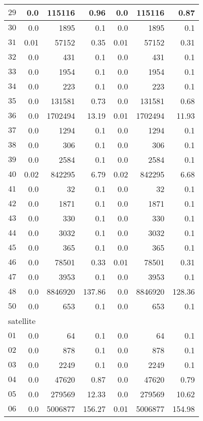 \begin{longtable}{|c||r|r|r||r|r|r|}
$29$ & 0.0 & 115116 & 0.96 &0.0 & 115116 & 0.87 \\\hline
$30$ & 0.0 & 1895 & 0.1 &0.0 & 1895 & 0.1 \\\hline
$31$ & 0.01 & 57152 & 0.35 &0.01 & 57152 & 0.31 \\\hline
$32$ & 0.0 & 431 & 0.1 &0.0 & 431 & 0.1 \\\hline
$33$ & 0.0 & 1954 & 0.1 &0.0 & 1954 & 0.1 \\\hline
$34$ & 0.0 & 223 & 0.1 &0.0 & 223 & 0.1 \\\hline
$35$ & 0.0 & 131581 & 0.73 &0.0 & 131581 & 0.68 \\\hline
$36$ & 0.0 & 1702494 & 13.19 &0.01 & 1702494 & 11.93 \\\hline
$37$ & 0.0 & 1294 & 0.1 &0.0 & 1294 & 0.1 \\\hline
$38$ & 0.0 & 306 & 0.1 &0.0 & 306 & 0.1 \\\hline
$39$ & 0.0 & 2584 & 0.1 &0.0 & 2584 & 0.1 \\\hline
$40$ & 0.02 & 842295 & 6.79 &0.02 & 842295 & 6.68 \\\hline
$41$ & 0.0 & 32 & 0.1 &0.0 & 32 & 0.1 \\\hline
$42$ & 0.0 & 1871 & 0.1 &0.0 & 1871 & 0.1 \\\hline
$43$ & 0.0 & 330 & 0.1 &0.0 & 330 & 0.1 \\\hline
$44$ & 0.0 & 3032 & 0.1 &0.0 & 3032 & 0.1 \\\hline
$45$ & 0.0 & 365 & 0.1 &0.0 & 365 & 0.1 \\\hline
$46$ & 0.0 & 78501 & 0.33 &0.01 & 78501 & 0.31 \\\hline
$47$ & 0.0 & 3953 & 0.1 &0.0 & 3953 & 0.1 \\\hline
$48$ & 0.0 & 8846920 & 137.86 &0.0 & 8846920 & 128.36 \\\hline
$50$ & 0.0 & 653 & 0.1 &0.0 & 653 & 0.1 \\\hline

\multicolumn{7}{|l|}{satellite}\\\hline
$01$ & 0.0 & 64 & 0.1 &0.0 & 64 & 0.1 \\\hline
$02$ & 0.0 & 878 & 0.1 &0.0 & 878 & 0.1 \\\hline
$03$ & 0.0 & 2249 & 0.1 &0.0 & 2249 & 0.1 \\\hline
$04$ & 0.0 & 47620 & 0.87 &0.0 & 47620 & 0.79 \\\hline
$05$ & 0.0 & 279569 & 12.33 &0.0 & 279569 & 10.62 \\\hline
$06$ & 0.0 & 5006877 & 156.27 &0.01 & 5006877 & 154.98 \\\hline


\end{longtable}
